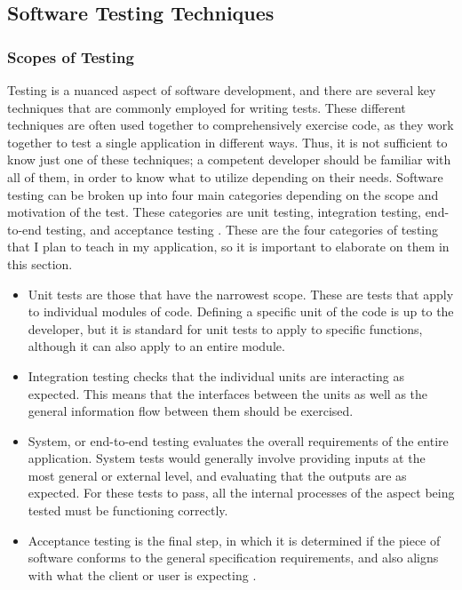 \documentclass[10pt,twocolumn]{article}
\begin{document}
\subsection{Software Testing Techniques}

\subsubsection{Scopes of Testing}

Testing is a nuanced aspect of software development, and there are several key techniques that are commonly employed for 
writing tests. These different techniques are often used together to comprehensively exercise code, as they work 
together to test a single application in different ways. Thus, it is not sufficient to know just one of these 
techniques; a competent developer should be familiar with all of them, in order to know what to utilize depending on 
their needs. Software testing can be broken up into four main categories depending on the scope and motivation of the 
test. These categories are unit testing, integration testing, end-to-end testing, and acceptance testing 
\cite{Luo2001Article}. These are the four categories of testing that I plan to teach in my application, so it is 
important to elaborate on them in this section. 

\begin{itemize}
    \item{Unit tests are those that have the narrowest 
    scope. These are tests that apply to individual modules of code. Defining a specific unit of the code is up to the 
    developer, but it is standard for unit tests to apply to specific functions, although it can also apply to an entire 
    module.}
    \item{Integration testing checks that the individual units are interacting as expected. This means that the interfaces 
    between the units as well as the general information flow between them should be exercised.}
    \item{System, or end-to-end 
    testing evaluates the overall requirements of the entire application. System tests would generally involve providing 
    inputs at the most general or external level, and evaluating that the outputs are as expected. For these tests to pass, 
    all the internal processes of the aspect being tested must be functioning correctly.}
    \item{Acceptance testing is the final 
    step, in which it is determined if the piece of software conforms to the general specification requirements, and also 
    aligns with what the client or user is expecting \cite{Luo2001Article}. }
\end{itemize}
   
\end{document}
